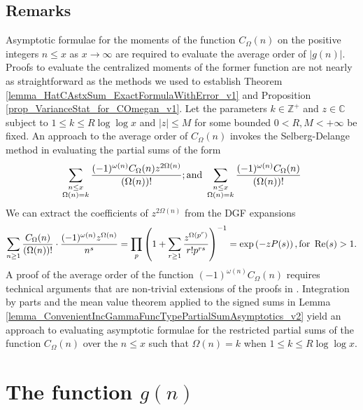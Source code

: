 \documentclass[11pt,reqno,a4letter]{article}
\newcommand{\hlocalref}[1]{\hyperref[#1]{\ref{#1}}}
\numberwithin{equation}{section}
\numberwithin{figure}{section}
\numberwithin{table}{section}
\theoremstyle{plain}
\numberwithin{theorem}{section}
\theoremstyle{definition}
\theoremstyle{remark}
\renewcommand{\Re}{\operatorname{Re}}
\newcommand{\mathtext}[1]{\text{\rm #1}}
\begin{document}
\subsection{Remarks} 
\label{subSection_RemarksOnAvgOrderFor_COmegan_directly_SelbergDelangeMethod} 

Asymptotic formulae for the moments of the function $C_{\Omega}(n)$ on the 
positive integers $n \leq x$ as $x \rightarrow \infty$ are required 
to evaluate the average order of $|g(n)|$.  
Proofs to evaluate the centralized moments of the former function are not 
nearly as straightforward as the methods we used to establish 
Theorem \hlocalref{lemma_HatCAstxSum_ExactFormulaWithError_v1} and 
Proposition \hlocalref{prop_VarianceStat_for_COmegan_v1}. 
Let the parameters $k \in \mathbb{Z}^{+}$ and $z \in \mathbb{C}$ subject to 
$1 \leq k \leq R \log\log x$ and $|z| \leq M$ for some bounded
$0 < R, M < +\infty$ be fixed. 
An approach to the average order of $C_{\Omega}(n)$ 
invokes the Selberg-Delange method 
\cite[\S II.6.1]{TENENBAUM-PROBNUMT-METHODS} \cite[\S 7.4]{MV} 
in evaluating the partial sums of the form 
\[
\sum_{\substack{n \leq x \\ \Omega(n)=k}} \frac{(-1)^{\omega(n)} 
     C_{\Omega}(n) z^{2\Omega(n)}}{(\Omega(n))!}; \mathtext{ and } 
     \sum_{\substack{n \leq x \\ \Omega(n)=k}} \frac{(-1)^{\omega(n)} 
     C_{\Omega}(n)}{(\Omega(n))!} 
\]
We can extract the coefficients of $z^{2\Omega(n)}$ 
from the DGF expansions  
\[
\sum_{n \geq 1} \frac{C_{\Omega}(n)}{(\Omega(n))!} \cdot 
     \frac{(-1)^{\omega(n)} z^{\Omega(n)}}{n^s} = \prod_p \left(1 + \sum_{r \geq 1} 
     \frac{z^{\Omega(p^r)}}{r! p^{rs}}\right)^{-1} 
     = \exp\left(-z P(s)\right), \mathtext{ for } \Re(s) > 1. 
\]
A proof of the average order of the 
function $(-1)^{\omega(n)} C_{\Omega}(n)$ requires technical arguments 
that are non-trivial extensions of the proofs in 
\cite{MV,TENENBAUM-PROBNUMT-METHODS}. 
Integration by parts and the mean value theorem applied to the 
signed sums in Lemma \hlocalref{lemma_ConvenientIncGammaFuncTypePartialSumAsymptotics_v2} 
yield an approach to evaluating asymptotic formulae for the restricted partial sums of 
the function $C_{\Omega}(n)$ over the $n \leq x$ such that $\Omega(n) = k$ 
when $1 \leq k \leq R \log\log x$. 

\section{The function $g(n)$} 
\label{Section_NewFormulasForgInvn_v2} 
\end{document}
